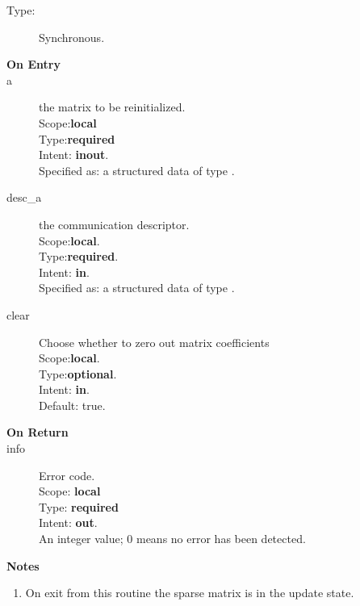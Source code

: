 \begin{description}
\item[Type:] Synchronous.
\item[\bf On Entry]
\item[a] the matrix to be reinitialized.\\
Scope:{\bf local}\\
Type:{\bf required}\\
Intent: {\bf inout}.\\
Specified as: a structured data of type \spdata.
\item[desc\_a] the communication descriptor.\\
Scope:{\bf local}.\\
Type:{\bf required}.\\
Intent: {\bf in}.\\
Specified as: a structured data of type \descdata.
\item[clear] Choose whether to zero out matrix coefficients\\
Scope:{\bf local}.\\
Type:{\bf optional}.\\
Intent: {\bf in}.\\
Default: true.
\end{description}

\begin{description}
\item[\bf On Return]
\item[info] Error code.\\
Scope: {\bf local} \\
Type: {\bf required} \\
Intent: {\bf out}.\\
An integer value; 0 means no error has been detected. 
\end{description}
{\par\noindent\large\bfseries Notes}
\begin{enumerate}
\item On exit from this routine the sparse matrix is in the update
  state. 
\end{enumerate}
%
%


